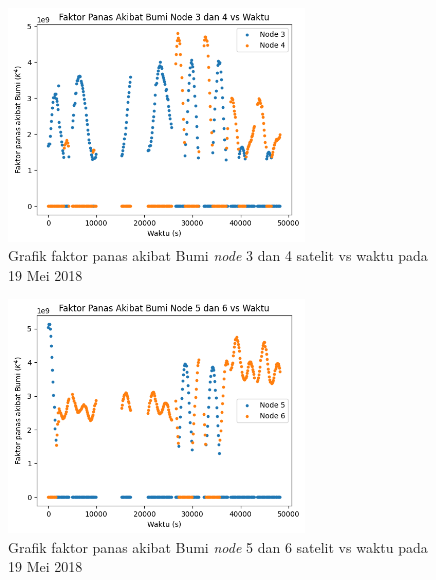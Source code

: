 \begin{figure}[H]
\setlength{}
\begin{center}
\includegraphics[width=0.7\textwidth]{fig/earth_node34_2018-05-19.png}
	\caption{Grafik faktor panas akibat Bumi \textit{node} 3 dan 4 satelit vs waktu pada 19 Mei 2018}
\label{fig:earth3419}
\end{center}
\end{figure}

\begin{figure}[H]
\setlength{}
\begin{center}
\includegraphics[width=0.7\textwidth]{fig/earth_node56_2018-05-19.png}
	\caption{Grafik faktor panas akibat Bumi \textit{node} 5 dan 6 satelit vs waktu pada 19 Mei 2018}
\label{fig:earth5619}
\end{center}
\end{figure}

